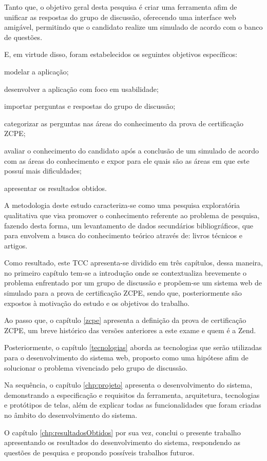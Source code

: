 
Tanto que, o objetivo geral desta pesquisa é criar uma ferramenta afim de
unificar as respostas do grupo de discussão, oferecendo uma interface web
amigável, permitindo que o candidato realize um simulado de
acordo com o banco de questões.


E, em virtude disso, foram estabelecidos os seguintes objetivos
específicos:

\begin{alineas}
    \item modelar a aplicação;
    \item desenvolver a aplicação com foco em usabilidade;
    \item importar perguntas e respostas do grupo de discussão;
    \item categorizar as perguntas nas áreas do conhecimento da prova de
    certificação \acs{ZCPE};
    \item avaliar o conhecimento do candidato após a conclusão de um simulado
    de acordo com as áreas do conhecimento e expor para ele quais são as áreas  em
    que este possuí mais dificuldades;
    \item apresentar os resultados obtidos.
\end{alineas}


A metodologia deste estudo caracteriza-se como uma pesquisa exploratória
qualitativa que visa promover o conhecimento referente ao problema de pesquisa, fazendo desta forma,
um levantamento de dados secundários bibliográficos, que para
 envolvem a busca do conhecimento
teórico através de: livros técnicos e artigos.

Como resultado, este \acs{TCC} apresenta-se dividido em três capítulos, dessa
maneira, no primeiro capítulo tem-se a introdução onde se contextualiza brevemente o problema
enfrentado por um grupo de discussão e propõem-se um sistema web de
simulado para a prova de certificação \acs{ZCPE}, sendo que, posteriormente são
expostos à motivação do estudo e os objetivos do trabalho.

Ao passo que, o capítulo \ref{zcpe} apresenta a definição da prova de
certificação \acl{ZCPE}, um breve histórico das versões anteriores a este
exame e quem é a \acs{Zend}.

Posteriormente, o capítulo \ref{tecnologias} aborda as tecnologias que serão
utilizadas para o desenvolvimento do sistema web, proposto como uma hipótese
afim de solucionar o problema vivenciado pelo grupo de discussão.

Na sequência, o capítulo \ref{chp:projeto} apresenta o desenvolvimento do
sistema, demonstrando a especificação e requisitos da ferramenta, arquitetura,
tecnologias e protótipos de telas, além de explicar todas as funcionalidades
que foram criadas no âmbito do desenvolvimento do sistema.

O capítulo \ref{chp:resultadosObtidos} por sua vez, conclui o presente trabalho
apresentando os resultados do desenvolvimento do sistema, respondendo as
questões de pesquisa e propondo possíveis trabalhos futuros.